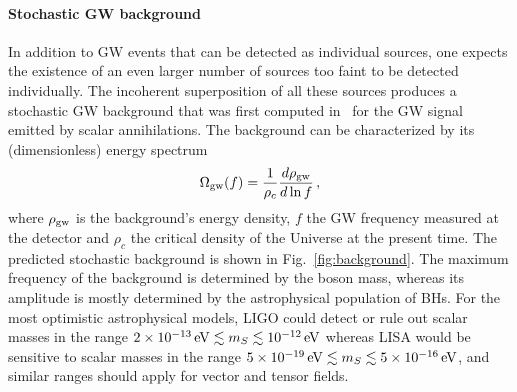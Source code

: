 \documentclass[11pt]{article}
\numberwithin{equation}{section} %
\begin{document}
\paragraph{Stochastic GW background}
In addition to GW events that can be detected as individual sources, one expects the existence of an even larger number of sources too faint to be detected individually. The incoherent superposition of all these sources produces a stochastic GW background that was first computed in~\cite{Brito:2017wnc,Brito:2017zvb} for the GW signal emitted by scalar annihilations. The background can be characterized by its (dimensionless) 
energy spectrum
\begin{equation}
\Omega_{\rm gw}(f)=\frac{1}{\rho_c}\frac{d\rho_{\rm gw}}{d\ln f}\,, \label{OmegaGW}
\end{equation}
where $\rho_{\rm gw}$ is the background's energy density, $f$ the GW frequency measured at the detector
and $\rho_c$ the critical density of the Universe at the present time. The predicted stochastic background is shown in Fig.~\ref{fig:background}.  The maximum frequency of the background is determined by the boson mass, whereas its amplitude is mostly determined by the astrophysical population of BHs. 
%
For the most optimistic astrophysical models, LIGO could detect or rule out scalar masses in the range $2\times 10^{-13}\,{\rm eV} \lesssim m_S \lesssim 10^{-12}\,{\rm eV}$ whereas LISA would be sensitive to scalar masses in the range $5\times 10^{-19}\,{\rm eV}\lesssim m_S \lesssim 5\times 10^{-16}\,{\rm eV}$, and similar ranges should apply for vector and tensor fields.
\end{document}
